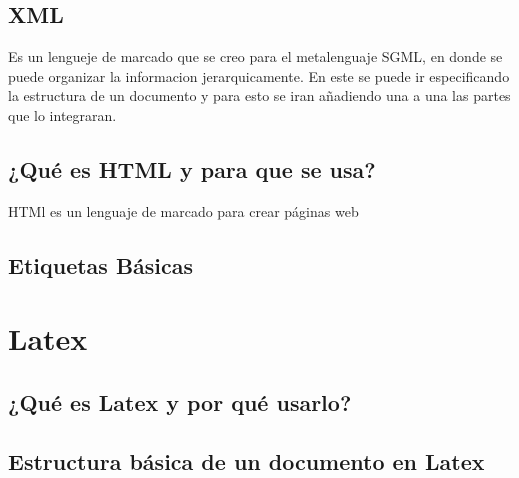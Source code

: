 \documentclass[11pt,letterpaper]{article}
\begin{document}
\subsection{XML}
Es un lengueje de marcado que se creo para el metalenguaje SGML, en donde se puede organizar la informacion jerarquicamente.
En este se puede ir especificando la estructura de un documento y para esto se iran añadiendo una a una las partes que lo integraran.
\subsection{¿Qué es HTML y para que se usa?}
HTMl es un lenguaje de marcado para crear páginas web
\subsection{Etiquetas Básicas}
\section{Latex}
\subsection{¿Qué es Latex y por qué usarlo?}
\subsection{Estructura básica de un documento en Latex}
\end{document}
